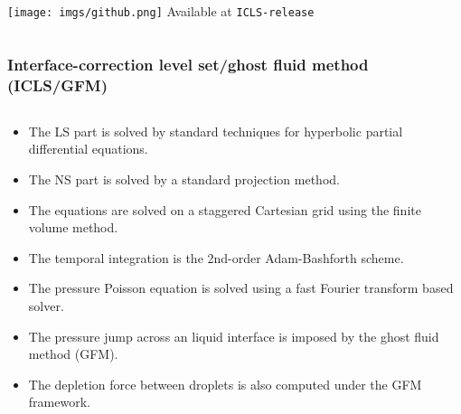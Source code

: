 \begin{frame}[noframenumbering]
\begin{columns}
    \begin{column}{0.2\textwidth}
      \vskip5.5cm
      \centering
      \texttt{[image: imgs/github.png]}
      \vskip0.1cm
      Available at \texttt{ICLS-release}
    \end{column}
  \end{columns}

\end{frame}
\begin{frame}[noframenumbering]
  \frametitle{Interface-correction level set/ghost fluid method (ICLS/GFM)}

  \begin{columns}
    
    \begin{column}{0.9\textwidth}
      
      \begin{bluecolorbox}
        \medskip
        \begin{itemize}
        \item The LS part is solved by standard techniques for hyperbolic partial differential equations. \medskip
        \item The NS part is solved by a standard projection method. \medskip
        \item The equations are solved on a staggered Cartesian grid using the finite volume method. \medskip
        \item The temporal integration is the 2nd-order Adam-Bashforth scheme. \medskip
        \item The pressure Poisson equation is solved using a fast Fourier transform based solver. \medskip
        \item The pressure jump across an liquid interface is imposed by the ghost fluid method (GFM). \medskip
        \item The depletion force between droplets is also computed under the GFM framework. \medskip
        \end{itemize}
      \end{bluecolorbox}
       
    \end{column}
    
  \end{columns}

  \vskip0.5cm
  \pause
  \centering
  
\end{frame}



